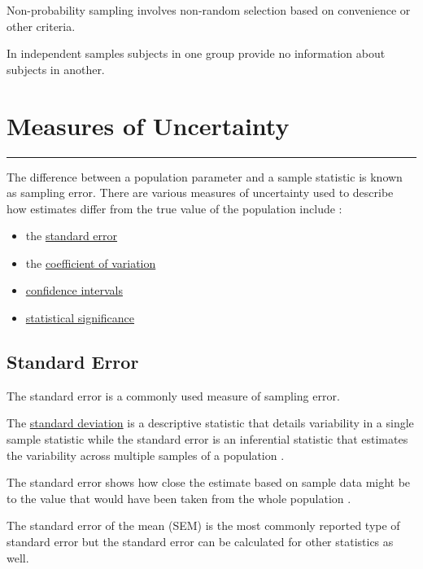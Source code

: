 \documentclass[
]{book}
\begin{document}
Non-probability sampling involves non-random selection based on convenience or other criteria.

In independent samples subjects in one group provide no information about subjects in another.

\hypertarget{error}{%
\chapter{Measures of Uncertainty}\label{error}}

\begin{center}\rule{0.5\linewidth}{0.5pt}\end{center}

The difference between a population parameter and a sample statistic is known as sampling error. There are various measures of uncertainty used to describe how estimates differ from the true value of the population include \citep{uncertainty}:

\begin{itemize}
\item
  the \protect\hyperlink{stderr}{standard error}
\item
  the \protect\hyperlink{coeff}{coefficient of variation}
\item
  \protect\hyperlink{confint}{confidence intervals}
\item
  \protect\hyperlink{signif}{statistical significance}
\end{itemize}

\hypertarget{stderr}{%
\section{Standard Error}\label{stderr}}

The standard error is a commonly used measure of sampling error.

The \protect\hyperlink{stdv}{standard deviation} is a descriptive statistic that details variability in a single sample statistic while the standard error is an inferential statistic that estimates the variability across multiple samples of a population \citep{lee}.

The standard error shows how close the estimate based on sample data might be to the value that would have been taken from the whole population \citep{uncertainty}.

The standard error of the mean (SEM) is the most commonly reported type of standard error but the standard error can be calculated for other statistics as well.
\end{document}

